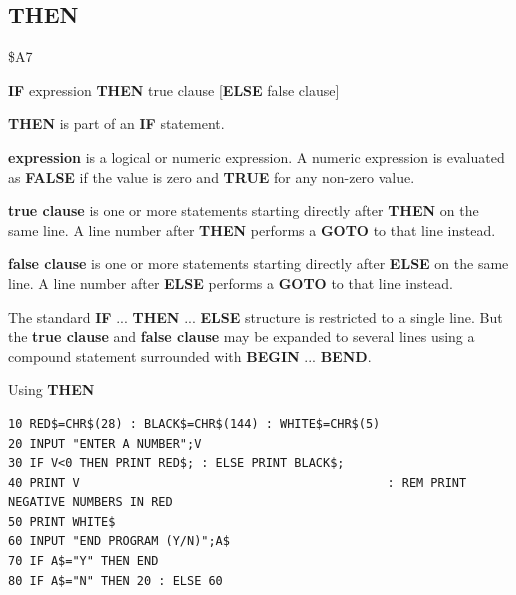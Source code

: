 
\newpage
\subsection{THEN}
\begin{description}[leftmargin=2cm,style=nextline]
\item [Token:]    \$A7

\item [Format:]   {\bf IF} expression {\bf THEN} true clause [{\bf ELSE} false clause]

\item [Usage:]    {\bf THEN} is part of an {\bf IF} statement.

                  {\bf expression} is a logical or numeric expression. A numeric expression is evaluated as {\bf FALSE} if the value is zero and {\bf TRUE} for any non-zero value.

                  {\bf true clause} is one or more statements starting directly after {\bf THEN} on the same line. A line number after {\bf THEN} performs a {\bf GOTO} to that line instead.

                  {\bf false clause} is one or more statements starting directly after {\bf ELSE} on the same line. A line number after {\bf ELSE} performs a {\bf GOTO} to that line instead.

\item [Remarks:]  The standard {\bf IF} ... {\bf THEN} ... {\bf ELSE} structure is restricted to a single line. But the {\bf true clause} and {\bf false clause} may be expanded to several lines using a compound statement surrounded with {\bf BEGIN} ... {\bf BEND}.

\item [Example:]  Using {\bf THEN}

\begin{tcolorbox}[colback=black,coltext=white]
\verbatimfont{\codefont}
\begin{verbatim}
10 RED$=CHR$(28) : BLACK$=CHR$(144) : WHITE$=CHR$(5)
20 INPUT "ENTER A NUMBER";V
30 IF V<0 THEN PRINT RED$; : ELSE PRINT BLACK$;
40 PRINT V                                           : REM PRINT NEGATIVE NUMBERS IN RED
50 PRINT WHITE$
60 INPUT "END PROGRAM (Y/N)";A$
70 IF A$="Y" THEN END
80 IF A$="N" THEN 20 : ELSE 60
\end{verbatim}
\end{tcolorbox}
\end{description}

